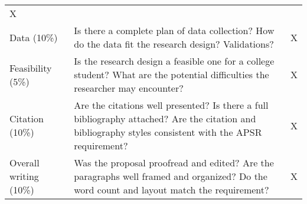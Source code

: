 \documentclass[11pt,]{article}
\theoremstyle{definition}
\theoremstyle{definition}
\theoremstyle{remark}
\begin{document}
\begin{longtable}[]{@{}lll@{}}
\begin{minipage}[t]{0.03\columnwidth}
X\strut
\end{minipage}\tabularnewline
\begin{minipage}[t]{0.12\columnwidth}\raggedright\strut
Data (10\%)\strut
\end{minipage} & \begin{minipage}[t]{0.76\columnwidth}\raggedright\strut
Is there a complete plan of data collection? How do the data fit the
research design? Validations?\strut
\end{minipage} & \begin{minipage}[t]{0.03\columnwidth}\raggedright\strut
X\strut
\end{minipage}\tabularnewline
\begin{minipage}[t]{0.12\columnwidth}\raggedright\strut
Feasibility (5\%)\strut
\end{minipage} & \begin{minipage}[t]{0.76\columnwidth}\raggedright\strut
Is the research design a feasible one for a college student? What are
the potential difficulties the researcher may encounter?\strut
\end{minipage} & \begin{minipage}[t]{0.03\columnwidth}\raggedright\strut
X\strut
\end{minipage}\tabularnewline
\begin{minipage}[t]{0.12\columnwidth}\raggedright\strut
Citation (10\%)\strut
\end{minipage} & \begin{minipage}[t]{0.76\columnwidth}\raggedright\strut
Are the citations well presented? Is there a full bibliography attached?
Are the citation and bibliography styles consistent with the APSR
requirement?\strut
\end{minipage} & \begin{minipage}[t]{0.03\columnwidth}\raggedright\strut
X\strut
\end{minipage}\tabularnewline
\begin{minipage}[t]{0.12\columnwidth}\raggedright\strut
Overall writing (10\%)\strut
\end{minipage} & \begin{minipage}[t]{0.76\columnwidth}\raggedright\strut
Was the proposal proofread and edited? Are the paragraphs well framed
and organized? Do the word count and layout match the requirement?\strut
\end{minipage} & \begin{minipage}[t]{0.03\columnwidth}\raggedright\strut
X\strut
\end{minipage}\tabularnewline
\bottomrule
\end{longtable}
\end{document}
